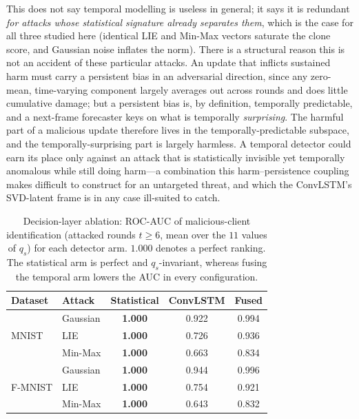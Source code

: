 \documentclass[journal]{IEEEtran}
\begin{document}
This does not say temporal modelling is useless in general; it says it is redundant \emph{for attacks whose statistical signature already separates them}, which is the case for all three studied here (identical LIE and Min-Max vectors saturate the clone score, and Gaussian noise inflates the norm). There is a structural reason this is not an accident of these particular attacks. An update that inflicts sustained harm must carry a persistent bias in an adversarial direction, since any zero-mean, time-varying component largely averages out across rounds and does little cumulative damage; but a persistent bias is, by definition, temporally predictable, and a next-frame forecaster keys on what is temporally \emph{surprising}. The harmful part of a malicious update therefore lives in the temporally-predictable subspace, and the temporally-surprising part is largely harmless. A temporal detector could earn its place only against an attack that is statistically invisible yet temporally anomalous while still doing harm---a combination this harm--persistence coupling makes difficult to construct for an untargeted threat, and which the ConvLSTM's SVD-latent frame is in any case ill-suited to catch.

\begin{table}[t]
\centering
\caption{Decision-layer ablation: ROC-AUC of malicious-client identification (attacked rounds $t\ge 6$, mean over the $11$ values of $q_s$) for each detector arm. $1.000$ denotes a perfect ranking. The statistical arm is perfect and $q_s$-invariant, whereas fusing the temporal arm lowers the AUC in every configuration.}
\label{tab:ablation_auc}
\setlength{\tabcolsep}{5pt}
\begin{tabular}{@{}llccc@{}}
\toprule
\textbf{Dataset} & \textbf{Attack} & \textbf{Statistical} & \textbf{ConvLSTM} & \textbf{Fused} \\
\midrule
\multirow{3}{*}{MNIST} & Gaussian & \textbf{1.000} & 0.922 & 0.994 \\
 & LIE & \textbf{1.000} & 0.726 & 0.936 \\
 & Min-Max & \textbf{1.000} & 0.663 & 0.834 \\
\midrule
\multirow{3}{*}{F-MNIST} & Gaussian & \textbf{1.000} & 0.944 & 0.996 \\
 & LIE & \textbf{1.000} & 0.754 & 0.921 \\
 & Min-Max & \textbf{1.000} & 0.643 & 0.832 \\
\bottomrule
\end{tabular}
\end{table}
\end{document}
